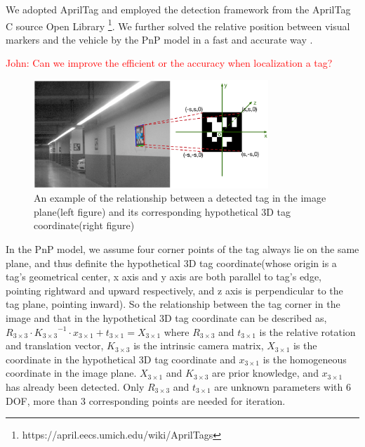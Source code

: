 \documentclass[journal]{IEEEtran}
\newcommand{\COMMENT}[1]{\textcolor{red}{#1}}
\begin{document}
We adopted AprilTag and employed the detection framework from the AprilTag C source Open Library \footnote{https://april.eecs.umich.edu/wiki/AprilTags}\cite{Olson2011AprilTag}.
We further solved the relative position between visual markers and the vehicle by the PnP model in a fast and accurate way \cite{Hartley2003Multiple}. 

\COMMENT{John: Can we improve the efficient or the accuracy when localization a tag?}

\begin{figure}
\centering
\includegraphics[height = 1.6in]{pic/fig7_Visual_markers}
\caption{
An example of the relationship between a detected tag in the image plane(left figure) and its corresponding hypothetical 3D tag coordinate(right figure)
}\label{fig:7}
\end{figure}

In the PnP model, we assume four corner points of the tag always lie on the same plane, and thus definite the hypothetical 3D tag coordinate(whose origin is a tag’s geometrical center, x axis and y axis are both parallel to tag’s edge, pointing rightward and upward respectively, and z axis is perpendicular to the tag plane, pointing inward). 
So the relationship between the tag corner in the image and that in the hypothetical 3D tag coordinate can be described as,
${R}_{3 \times 3} \cdot {{K}_{3 \times 3}}^{-1} \cdot {x}_{3 \times 1}+{t}_{3 \times 1}={X}_{3 \times 1}$
where ${R}_{3 \times 3}$ and ${t}_{3 \times 1}$ is the relative rotation and translation vector, 
${K}_{3 \times 3}$ is the intrinsic camera matrix, 
${X}_{3 \times 1}$ is the coordinate in the hypothetical 3D tag coordinate and ${x}_{3 \times 1}$ is the homogeneous coordinate in the image plane. 
${X}_{3 \times 1}$ and ${K}_{3 \times 3}$ are prior knowledge, 
and ${x}_{3 \times 1}$ has already been detected. 
Only ${R}_{3 \times 3}$ and ${t}_{3 \times 1}$ are unknown parameters with 6 DOF, more than 3 corresponding points are needed for iteration. 
\end{document}
